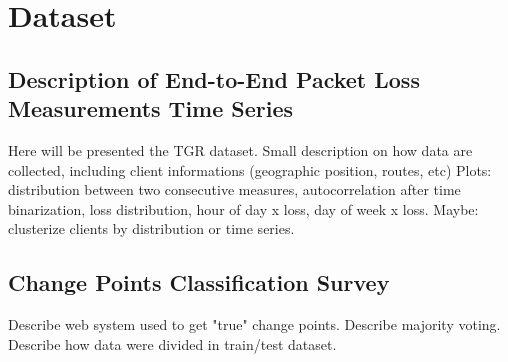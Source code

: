 \chapter{Dataset}
  \section{Description of End-to-End Packet Loss Measurements Time Series}
  Here will be presented the TGR dataset. 
  Small description on how data are collected, including client informations (geographic position, routes, etc)
  Plots: distribution between two consecutive measures, autocorrelation after time binarization, loss distribution, hour of day x loss, day of week x loss.
  Maybe: clusterize clients by distribution or time series.
  \section{Change Points Classification Survey}
  Describe web system used to get "true" change points.
  Describe majority voting.
  Describe how data were divided in train/test dataset.  

